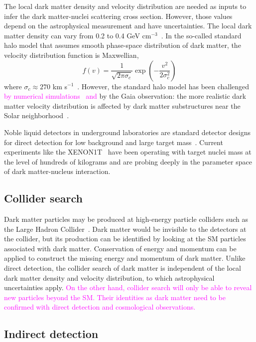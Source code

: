 \documentclass[doublespace,nopageskip]{VTthesis} %
\newcommand{\DS}[1]{\textcolor{magenta}{#1}}
\begin{document}
The local dark matter density and velocity distribution are needed as inputs to infer the dark matter-nuclei scattering cross section. However, those values depend on the astrophysical measurement and have uncertainties. The local dark matter density can vary from 0.2 to 0.4 GeV cm$^{-3}$~\cite{2010A&A...509A..25W}. In the so-called standard halo model that assumes smooth phase-space distribution of dark matter, the velocity distribution function is Maxwellian,
\begin{equation}
    f(v) = \frac{1}{\sqrt{2\pi \sigma_c}}\exp\left(-\frac{v^2}{2\sigma_c^2}\right)
\end{equation}
where $\sigma_c \approx 270$ km s$^{-1}$~\cite{2012PDU.....1...94B}. However, the standard halo model has been challenged \DS{by numerical simulations~\cite{2013ApJ...764...35M} and }by the Gaia observation: the more realistic dark matter velocity distribution is affected by dark matter substructures near the Solar neighborhood~\cite{2019ApJ...874....3N}. 

Noble liquid detectors in underground laboratories are standard detector designs for direct detection for low background and large target mass~\cite{2012PDU.....1...94B}. Current experiments like the XENON1T~\cite{2019PhRvL.122g1301A} have been operating with target nuclei mass at the level of hundreds of kilograms and are probing deeply in the parameter space of dark matter-nucleus interaction.

\subsection{Collider search}

Dark matter particles may be produced at high-energy particle colliders such as the Large Hadron Collider~\cite{2013IJMPA..2830052M}. Dark matter would be invisible to the detectors at the collider, but its production can be identified by looking at the SM particles associated with dark matter. Conservation of energy and momentum can be applied to construct the missing energy and momentum of dark matter. Unlike direct detection, the collider search of dark matter is independent of the local dark matter density and velocity distribution, to which astrophysical uncertainties apply. \DS{On the other hand, collider search will only be able to reveal new particles beyond the SM. Their identities as dark matter need to be confirmed with direct detection and cosmological observations.}

\subsection{Indirect detection}\label{sse:indirect}
\end{document}
